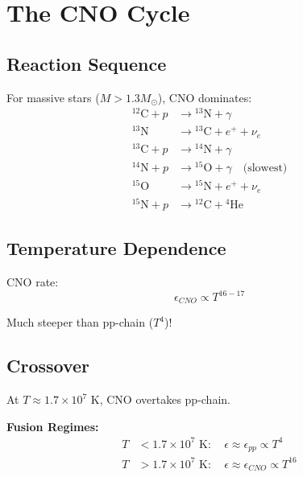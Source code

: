 \documentclass[12pt,a4paper]{article}
\newcommand{\Msun}{M_\odot}
\begin{document}

\section{The CNO Cycle}

\subsection{Reaction Sequence}

For massive stars ($M > 1.3 \Msun$), CNO dominates:
\begin{align}
{}^{12}\text{C} + p &\to {}^{13}\text{N} + \gamma \\
{}^{13}\text{N} &\to {}^{13}\text{C} + e^+ + \nu_e \\
{}^{13}\text{C} + p &\to {}^{14}\text{N} + \gamma \\
{}^{14}\text{N} + p &\to {}^{15}\text{O} + \gamma \quad \text{(slowest)} \\
{}^{15}\text{O} &\to {}^{15}\text{N} + e^+ + \nu_e \\
{}^{15}\text{N} + p &\to {}^{12}\text{C} + {}^4\text{He}
\end{align}

\subsection{Temperature Dependence}

CNO rate:
\begin{equation}
\epsilon_{CNO} \propto T^{16-17}
\end{equation}

Much steeper than pp-chain ($T^4$)!

\subsection{Crossover}

At $T \approx 1.7 \times 10^7$ K, CNO overtakes pp-chain.

\begin{keyresult}
\textbf{Fusion Regimes:}
\begin{align}
T &< 1.7 \times 10^7 \text{ K}: \quad \epsilon \approx \epsilon_{pp} \propto T^4 \\
T &> 1.7 \times 10^7 \text{ K}: \quad \epsilon \approx \epsilon_{CNO} \propto T^{16}
\end{align}
\end{keyresult}
\end{document}
